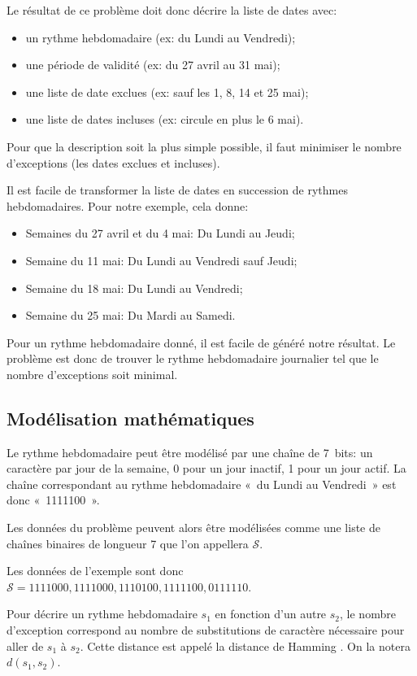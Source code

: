 \documentclass{roadef}
\def\S{\mathcal{S}}
\begin{document}
Le résultat de ce problème doit donc décrire la liste de dates avec:
\begin{itemize}
\item un rythme hebdomadaire (ex: du Lundi au Vendredi);
\item une période de validité (ex: du 27 avril au 31 mai);
\item une liste de date exclues (ex: sauf les 1, 8, 14 et 25 mai);
\item une liste de dates incluses (ex: circule en plus le 6 mai).
\end{itemize}

Pour que la description soit la plus simple possible, il faut
minimiser le nombre d'exceptions (les dates exclues et incluses).

Il est facile de transformer la liste de dates en succession de
rythmes hebdomadaires. Pour notre exemple, cela donne:
\begin{itemize}
\item Semaines du 27 avril et du 4 mai: Du Lundi au Jeudi;
\item Semaine du 11 mai: Du Lundi au Vendredi sauf Jeudi;
\item Semaine du 18 mai: Du Lundi au Vendredi;
\item Semaine du 25 mai: Du Mardi au Samedi.
\end{itemize}

Pour un rythme hebdomadaire donné, il est facile de généré notre
résultat.  Le problème est donc de trouver le rythme hebdomadaire
journalier tel que le nombre d'exceptions soit minimal.

\subsection{Modélisation mathématiques}

Le rythme hebdomadaire peut être modélisé par une chaîne de 7~bits: un
caractère par jour de la semaine, 0 pour un jour inactif, 1 pour un
jour actif. La chaîne correspondant au rythme hebdomadaire «~du Lundi
au Vendredi~» est donc «~1111100~».

Les données du problème peuvent alors être modélisées comme une liste
de chaînes binaires de longueur 7 que l'on appellera $\S$.

Les données de l'exemple sont donc
\begin{math}
  \S = 1111000, 1111000, 1110100, 1111100, 0111110
\end{math}.

Pour décrire un rythme hebdomadaire $s_1$ en fonction d'un autre
$s_2$, le nombre d'exception correspond au nombre de substitutions de
caractère nécessaire pour aller de $s_1$ à $s_2$. Cette distance est
appelé la distance de Hamming \cite{hamming1950error}. On la notera
$d(s_1, s_2)$.
\end{document}
